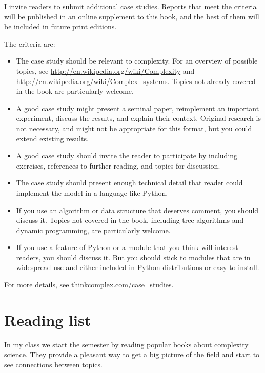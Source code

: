 \documentclass[10pt]{book}
\begin{document}
I invite readers to submit additional case studies.  Reports
that meet the criteria will be published in an online supplement
to this book, and the best of them will be included in future
print editions.

The criteria are:

\begin{itemize}

\item The case study should be relevant to complexity.  For an
  overview of possible topics, see
  \url{http://en.wikipedia.org/wiki/Complexity} and
  \url{http://en.wikipedia.org/wiki/Complex_systems}.  Topics
  not already covered in the book are particularly welcome.

\item A good case study might present a seminal paper, reimplement
  an important experiment, discuss the results, and explain their
  context.  Original research is not necessary, and might not
  be appropriate for this format, but you could extend existing
  results.

\item A good case study should invite the reader to participate
  by including exercises, references to further reading, and
  topics for discussion.

\item The case study should present enough technical detail that
   reader could implement the model in a language like Python.

\item If you use an algorithm or data structure that deserves comment,
  you should discuss it.  Topics not covered in the book, including
  tree algorithms and dynamic programming, are particularly welcome.

\item If you use a feature of Python or a module that you think
  will interest readers, you should discuss it.  But you should
  stick to modules that are in widespread use and either included
  in Python distributions or easy to install.

\end{itemize}

For more details, see \url{thinkcomplex.com/case_studies}.


\chapter{Reading list}
\label{reading}

In my class we start the semester by reading popular books about
complexity science.  They provide a pleasant way to get a big picture
of the field and start to see connections between topics.
\end{document}
